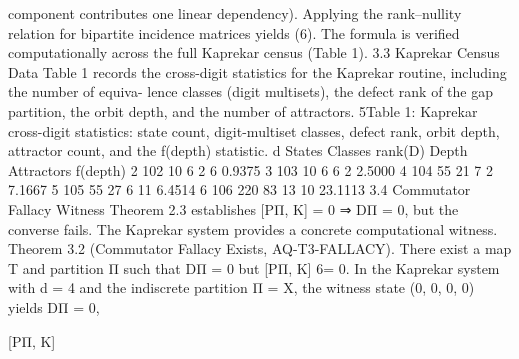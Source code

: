 component contributes one linear dependency). Applying the rank–nullity relation for bipartite
incidence matrices yields (6).
The formula is verified computationally across the full Kaprekar census (Table 1).
3.3 Kaprekar Census Data
Table 1 records the cross-digit statistics for the Kaprekar routine, including the number of equiva-
lence classes (digit multisets), the defect rank of the gap partition, the orbit depth, and the number
of attractors.
5Table 1: Kaprekar cross-digit statistics: state count, digit-multiset classes, defect rank, orbit depth,
attractor count, and the f(depth) statistic.
d States Classes rank(D) Depth Attractors f(depth)
2 102 10 6 2 6 0.9375
3 103 10 6 6 2 2.5000
4 104 55 21 7 2 7.1667
5 105 55 27 6 11 6.4514
6 106 220 83 13 10 23.1113
3.4 Commutator Fallacy Witness
Theorem 2.3 establishes [PΠ, K] = 0 ⇒ DΠ = 0, but the converse fails. The Kaprekar system
provides a concrete computational witness.
Theorem 3.2 (Commutator Fallacy Exists, AQ-T3-FALLACY). There exist a map T and partition
Π such that DΠ = 0 but [PΠ, K] 6= 0. In the Kaprekar system with d = 4 and the indiscrete partition
Π = {X}, the witness state (0, 0, 0, 0) yields
DΠ = 0,



[PΠ, K]




